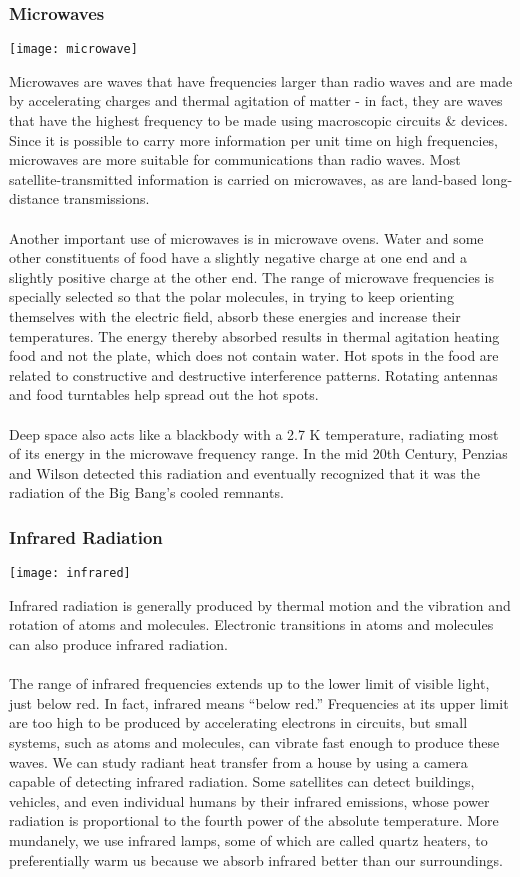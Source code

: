 \documentclass[11pt]{article}
\begin{document}
	\subsubsection*{Microwaves}
	\begin{center}
		\texttt{[image: microwave]}
	\end{center}
	Microwaves are waves that have frequencies larger than radio waves and are made by accelerating charges and thermal agitation of matter - in fact, they are waves that have the highest frequency to be made using macroscopic circuits \& devices. Since it is possible to carry more information per unit time on high frequencies, microwaves are more suitable for communications than radio waves. Most satellite-transmitted information is carried on microwaves, as are land-based long-distance transmissions. \\ \\
	Another important use of microwaves is in microwave ovens. Water and some other constituents of food have a slightly negative charge at one end and a slightly positive charge at the other end. The range of microwave frequencies is specially selected so that the polar molecules, in trying to keep orienting themselves with the electric field, absorb these energies and increase their temperatures. The energy thereby absorbed results in thermal agitation heating food and not the plate, which does not contain water. Hot spots in the food are related to constructive and destructive interference patterns. Rotating antennas and food turntables help spread out the hot spots. \\ \\
	Deep space also acts like a blackbody with a 2.7 K temperature, radiating most of its energy in the microwave frequency range. In the mid 20th Century, Penzias and Wilson detected this radiation and eventually recognized that it was the radiation of the Big Bang’s cooled remnants.
	\subsubsection*{Infrared Radiation}
	\begin{center}
		\texttt{[image: infrared]}
	\end{center}
	Infrared radiation is generally produced by thermal motion and the vibration and rotation of atoms and molecules. Electronic transitions in atoms and molecules can also produce infrared radiation. \\ \\
	The range of infrared frequencies extends up to the lower limit of visible light, just below red. In fact, infrared means “below red.” Frequencies at its upper limit are too high to be produced by accelerating electrons in circuits, but small systems, such as atoms and molecules, can vibrate fast enough to produce these waves. We can study radiant heat transfer from a house by using a camera capable of detecting infrared radiation. Some satellites can detect buildings, vehicles, and even individual humans by their infrared emissions, whose power radiation is proportional to the fourth power of the absolute temperature. More mundanely, we use infrared lamps, some of which are called quartz heaters, to preferentially warm us because we absorb infrared better than our surroundings.
\end{document}
